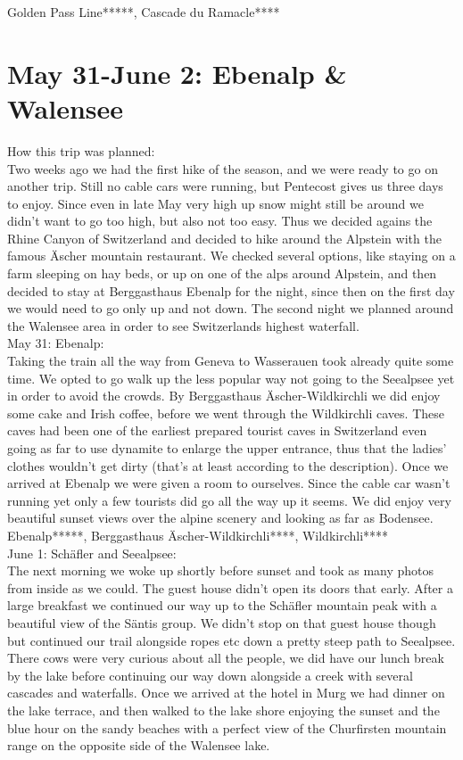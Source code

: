 Golden Pass Line*****, Cascade du Ramacle****

 \section{May 31-June 2: Ebenalp \& Walensee}
\label{2020:PentecostHike}

How this trip was planned:\\
Two weeks ago we had the first hike of the season, and we were ready to go on another trip. Still no cable cars were running, but Pentecost gives us three days to enjoy. Since even in late May very high up snow might still be around we didn't want to go too high, but also not too easy. Thus we decided agains the Rhine Canyon of Switzerland and decided to hike around the Alpstein with the famous \"Ascher mountain restaurant. We checked several options, like staying on a farm sleeping on hay beds, or up on one of the alps around Alpstein, and then decided to stay at Berggasthaus Ebenalp for the night, since then on the first day we would need to go only up and not down. The second night we planned around the Walensee area in order to see Switzerlands highest waterfall.\\

May 31: Ebenalp:\\
Taking the train all the way from Geneva to Wasserauen took already quite some time. We opted to go walk up the less popular way not going to the Seealpsee yet in order to avoid the crowds. By Berggasthaus \"Ascher-Wildkirchli we did enjoy some cake and Irish coffee, before we went through the Wildkirchli caves. These caves had been one of the earliest prepared tourist caves in Switzerland even going as far to use dynamite to enlarge the upper entrance, thus that the ladies' clothes wouldn't get dirty (that's at least according to the description). Once we arrived at Ebenalp we were given a room to ourselves. Since the cable car wasn't running yet only a few tourists did go all the way up it seems. We did enjoy very beautiful sunset views over the alpine scenery and looking as far as Bodensee. \\

Ebenalp*****, Berggasthaus \"Ascher-Wildkirchli****, Wildkirchli****\\

June 1: Sch\"afler and Seealpsee:\\
The next morning we woke up shortly before sunset and took as many photos from inside as we could. The guest house didn't open its doors that early. After a large breakfast we continued our way up to the Sch\"afler mountain peak with a beautiful view of the S\"antis group. We didn't stop on that guest house though but continued our trail alongside ropes etc down a pretty steep path to Seealpsee. There cows were very curious about all the people, we did have our lunch break by the lake before continuing our way down alongside a creek with several cascades and waterfalls. Once we arrived at the hotel in Murg we had dinner on the lake terrace, and then walked to the lake shore enjoying the sunset and the blue hour on the sandy beaches with a perfect view of the Churfirsten mountain range on the opposite side of the Walensee lake.\\


